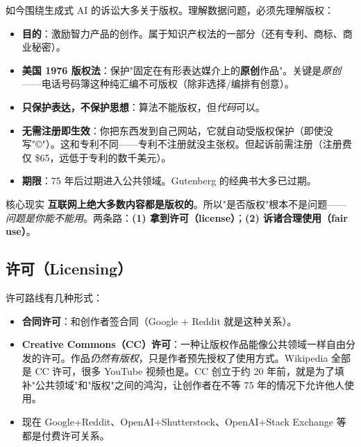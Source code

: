 \documentclass[a4paper]{article}
\begin{document}
如今围绕生成式 AI 的诉讼大多关于版权。理解数据问题，必须先理解版权：

\begin{tcolorbox}[enhanced, colback=blue!5!white, colframe=blue!75!black, sharp corners, title=\textbf{版权（Copyright）基础}]
\begin{itemize}
\item \textbf{目的}：激励智力产品的创作。属于知识产权法的一部分（还有专利、商标、商业秘密）。
\item \textbf{美国 1976 版权法}：保护"固定在有形表达媒介上的\textbf{原创}作品"。关键是\emph{原创}——电话号码簿这种纯汇编不可版权（除非选择/编排有创意）。
\item \textbf{只保护表达，不保护思想}：算法不能版权，但\emph{代码}可以。
\item \textbf{无需注册即生效}：你把东西发到自己网站，它就自动受版权保护（即使没写"©"）。这和专利不同——专利不注册就没主张权。但起诉前需注册（注册费仅 \$65，远低于专利的数千美元）。
\item \textbf{期限}：75 年后过期进入公共领域。Gutenberg 的经典书大多已过期。
\end{itemize}
\end{tcolorbox}

\begin{importantbox}{核心现实}
\textbf{互联网上绝大多数内容都是版权的}。所以"是否版权"根本不是问题——\emph{问题是你能不能用}。两条路：\textbf{(1) 拿到许可（license）}；\textbf{(2) 诉诸合理使用（fair use）}。
\end{importantbox}

\subsection{许可（Licensing）}

许可路线有几种形式：

\begin{itemize}
\item \textbf{合同许可}：和创作者签合同（Google + Reddit 就是这种关系）。
\item \textbf{Creative Commons（CC）许可}：一种让版权作品能像公共领域一样自由分发的许可。作品\emph{仍然有版权}，只是作者预先授权了使用方式。Wikipedia 全部是 CC 许可，很多 YouTube 视频也是。CC 创立于约 20 年前，就是为了填补"公共领域"和"版权"之间的鸿沟，让创作者在不等 75 年的情况下允许他人使用。
\item 现在 Google+Reddit、OpenAI+Shutterstock、OpenAI+Stack Exchange 等都是付费许可关系。
\end{itemize}
\end{document}
